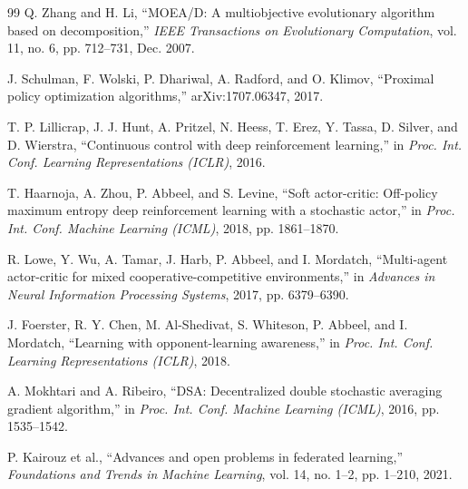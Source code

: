 \documentclass[conference]{IEEEtran}
\begin{document}
\begin{thebibliography}{99}
 Q. Zhang and H. Li, ``MOEA/D: A multiobjective evolutionary algorithm based on decomposition,'' \emph{IEEE Transactions on Evolutionary Computation}, vol. 11, no. 6, pp. 712--731, Dec. 2007.

 J. Schulman, F. Wolski, P. Dhariwal, A. Radford, and O. Klimov, ``Proximal policy optimization algorithms,'' arXiv:1707.06347, 2017.

 T. P. Lillicrap, J. J. Hunt, A. Pritzel, N. Heess, T. Erez, Y. Tassa, D. Silver, and D. Wierstra, ``Continuous control with deep reinforcement learning,'' in \emph{Proc. Int. Conf. Learning Representations (ICLR)}, 2016.

 T. Haarnoja, A. Zhou, P. Abbeel, and S. Levine, ``Soft actor-critic: Off-policy maximum entropy deep reinforcement learning with a stochastic actor,'' in \emph{Proc. Int. Conf. Machine Learning (ICML)}, 2018, pp. 1861--1870.

 R. Lowe, Y. Wu, A. Tamar, J. Harb, P. Abbeel, and I. Mordatch, ``Multi-agent actor-critic for mixed cooperative-competitive environments,'' in \emph{Advances in Neural Information Processing Systems}, 2017, pp. 6379--6390.

 J. Foerster, R. Y. Chen, M. Al-Shedivat, S. Whiteson, P. Abbeel, and I. Mordatch, ``Learning with opponent-learning awareness,'' in \emph{Proc. Int. Conf. Learning Representations (ICLR)}, 2018.

 A. Mokhtari and A. Ribeiro, ``DSA: Decentralized double stochastic averaging gradient algorithm,'' in \emph{Proc. Int. Conf. Machine Learning (ICML)}, 2016, pp. 1535--1542.

 P. Kairouz et al., ``Advances and open problems in federated learning,'' \emph{Foundations and Trends in Machine Learning}, vol. 14, no. 1--2, pp. 1--210, 2021.

\end{thebibliography}




\end{document}
